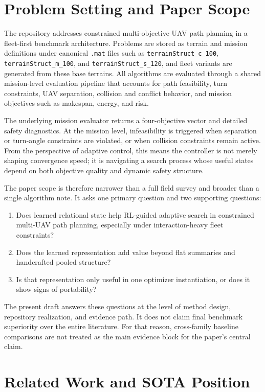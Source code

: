 \documentclass[a4paper,fleqn]{cas-sc}
\begin{document}
\section{Problem Setting and Paper Scope}

The repository addresses constrained multi-objective UAV path planning in a fleet-first benchmark architecture. Problems are stored as terrain and mission definitions under canonical \texttt{.mat} files such as \texttt{terrainStruct\_c\_100}, \texttt{terrainStruct\_m\_100}, and \texttt{terrainStruct\_s\_120}, and fleet variants are generated from these base terrains. All algorithms are evaluated through a shared mission-level evaluation pipeline that accounts for path feasibility, turn constraints, UAV separation, collision and conflict behavior, and mission objectives such as makespan, energy, and risk.

The underlying mission evaluator returns a four-objective vector and detailed safety diagnostics. At the mission level, infeasibility is triggered when separation or turn-angle constraints are violated, or when collision constraints remain active. From the perspective of adaptive control, this means the controller is not merely shaping convergence speed; it is navigating a search process whose useful states depend on both objective quality and dynamic safety structure.

The paper scope is therefore narrower than a full field survey and broader than a single algorithm note. It asks one primary question and two supporting questions:
\begin{enumerate}
\item Does learned relational state help RL-guided adaptive search in constrained multi-UAV path planning, especially under interaction-heavy fleet constraints?
\item Does the learned representation add value beyond flat summaries and handcrafted pooled structure?
\item Is that representation only useful in one optimizer instantiation, or does it show signs of portability?
\end{enumerate}

The present draft answers these questions at the level of method design, repository realization, and evidence path. It does not claim final benchmark superiority over the entire literature. For that reason, cross-family baseline comparisons are not treated as the main evidence block for the paper's central claim.

\section{Related Work and SOTA Position}
\end{document}
